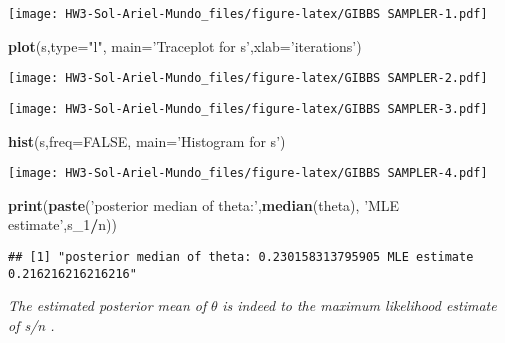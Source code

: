 \documentclass[
]{article}
\newenvironment{Shaded}{\begin{snugshade}}{\end{snugshade}}
\newcommand{\DataTypeTok}[1]{\textcolor[rgb]{0.13,0.29,0.53}{#1}}
\newcommand{\DecValTok}[1]{\textcolor[rgb]{0.00,0.00,0.81}{#1}}
\newcommand{\KeywordTok}[1]{\textcolor[rgb]{0.13,0.29,0.53}{\textbf{#1}}}
\newcommand{\NormalTok}[1]{#1}
\newcommand{\OperatorTok}[1]{\textcolor[rgb]{0.81,0.36,0.00}{\textbf{#1}}}
\newcommand{\OtherTok}[1]{\textcolor[rgb]{0.56,0.35,0.01}{#1}}
\newcommand{\StringTok}[1]{\textcolor[rgb]{0.31,0.60,0.02}{#1}}
\begin{document}
\texttt{[image: HW3-Sol-Ariel-Mundo\_files/figure-latex/GIBBS SAMPLER-1.pdf]}

\begin{Shaded}
\begin{Highlighting}[]
\KeywordTok{plot}\NormalTok{(s,}\DataTypeTok{type=}\StringTok{"l"}\NormalTok{, }\DataTypeTok{main=}\StringTok{'Traceplot for s'}\NormalTok{,}\DataTypeTok{xlab=}\StringTok{'iterations'}\NormalTok{)}
\end{Highlighting}
\end{Shaded}

\texttt{[image: HW3-Sol-Ariel-Mundo\_files/figure-latex/GIBBS SAMPLER-2.pdf]}

\begin{Shaded}
\end{Shaded}

\texttt{[image: HW3-Sol-Ariel-Mundo\_files/figure-latex/GIBBS SAMPLER-3.pdf]}

\begin{Shaded}
\begin{Highlighting}[]
\KeywordTok{hist}\NormalTok{(s,}\DataTypeTok{freq=}\OtherTok{FALSE}\NormalTok{, }\DataTypeTok{main=}\StringTok{'Histogram for s'}\NormalTok{)}
\end{Highlighting}
\end{Shaded}

\texttt{[image: HW3-Sol-Ariel-Mundo\_files/figure-latex/GIBBS SAMPLER-4.pdf]}

\begin{Shaded}
\begin{Highlighting}[]
\KeywordTok{print}\NormalTok{(}\KeywordTok{paste}\NormalTok{(}\StringTok{'posterior median of theta:'}\NormalTok{,}\KeywordTok{median}\NormalTok{(theta), }\StringTok{'MLE estimate'}\NormalTok{,s_}\DecValTok{1}\OperatorTok{/}\NormalTok{n))}
\end{Highlighting}
\end{Shaded}

\begin{verbatim}
## [1] "posterior median of theta: 0.230158313795905 MLE estimate 0.216216216216216"
\end{verbatim}

\begin{blue}

\emph{The estimated posterior mean of} \(\theta\) \emph{is indeed to the
maximum likelihood estimate of s/n .}

\end{blue}
\end{document}
